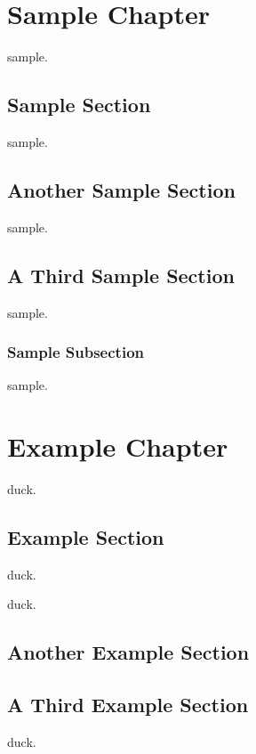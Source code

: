 \documentclass{report}
\begin{document}
\chapter{Sample Chapter}

\gls{sample}.

\section{Sample Section}

\gls{sample}.

\section{Another Sample Section}

\gls{sample}.

\section{A Third Sample Section}

\gls{sample}.

\subsection{Sample Subsection}

\gls{sample}.

\chapter{Example Chapter}

\lipsum[1-5]

\gls{duck}.

\section{Example Section}

\gls{duck}.

\lipsum[6-10]

\gls{duck}.

\section{Another Example Section}

\lipsum[11-20]

\section{A Third Example Section}

\gls{duck}.

\printunsrtglossaries
\end{document}
